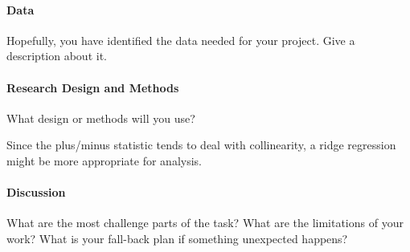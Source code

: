 \documentclass[12pt]{article}
\begin{document}
\paragraph{Data}
Hopefully, you have identified the data needed for your project. Give a
description about it.

\lipsum[3]

\paragraph{Research Design and Methods}
What design or methods will you use?

Since the plus/minus statistic tends to deal with collinearity, a ridge regression might be more
appropriate for analysis.

\lipsum[4]

\paragraph{Discussion}
What are the most challenge parts of the task?
What are the limitations of your work? What is your fall-back plan if
something unexpected happens?

\lipsum[5]



\end{document}
